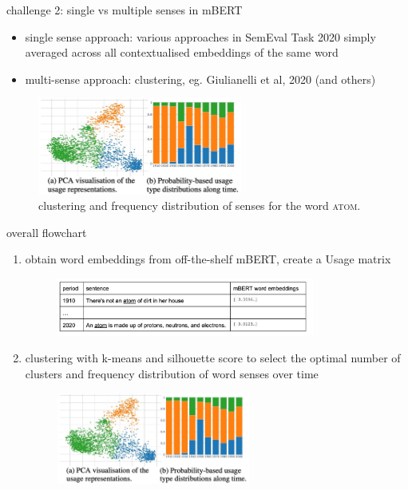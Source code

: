 \documentclass[10pt]{beamer}
\begin{document}
\begin{frame}{challenge 2: single vs multiple senses in mBERT}
\begin{itemize}
    \item single sense approach: various approaches in SemEval Task 2020 simply averaged across all contextualised embeddings of the same word 
    \item multi-sense approach: clustering, eg. Giulianelli et al, 2020 (and others)
\end{itemize}
\begin{figure}
    \centering
    \includegraphics[width=0.6\textwidth]{giulianelli.jpeg}
    \caption{clustering and frequency distribution of senses for the word \textsc{atom}. }
\end{figure} 
\end{frame}



\begin{frame}{overall flowchart}
\begin{enumerate}
  \item obtain word embeddings from off-the-shelf mBERT, create a Usage matrix
  \begin{figure}
    \centering
    \includegraphics[width=0.8\textwidth]{step1}
  \end{figure} 
  \item clustering with k-means and silhouette score to select the optimal number of clusters and frequency distribution of word senses over time
  \begin{figure}
    \centering
    \includegraphics[width=0.6\textwidth]{giulianelli.jpeg}
\end{figure} 
  \end{enumerate}
\end{frame}
\end{document}
